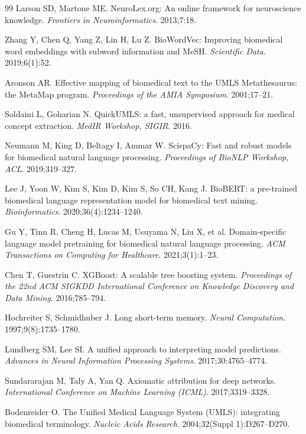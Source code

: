 \documentclass[11pt,a4paper]{article}
\begin{document}
\begin{thebibliography}{99}
Larson SD, Martone ME. NeuroLex.org: An online framework for neuroscience knowledge. \textit{Frontiers in Neuroinformatics}. 2013;7:18.

Zhang Y, Chen Q, Yang Z, Lin H, Lu Z. BioWordVec: Improving biomedical word embeddings with subword information and MeSH. \textit{Scientific Data}. 2019;6(1):52.

Aronson AR. Effective mapping of biomedical text to the UMLS Metathesaurus: the MetaMap program. \textit{Proceedings of the AMIA Symposium}. 2001;17--21.

Soldaini L, Goharian N. QuickUMLS: a fast, unsupervised approach for medical concept extraction. \textit{MedIR Workshop, SIGIR}. 2016.

Neumann M, King D, Beltagy I, Ammar W. ScispaCy: Fast and robust models for biomedical natural language processing. \textit{Proceedings of BioNLP Workshop, ACL}. 2019;319--327.

Lee J, Yoon W, Kim S, Kim D, Kim S, So CH, Kang J. BioBERT: a pre-trained biomedical language representation model for biomedical text mining. \textit{Bioinformatics}. 2020;36(4):1234--1240.

Gu Y, Tinn R, Cheng H, Lucas M, Usuyama N, Liu X, et al. Domain-specific language model pretraining for biomedical natural language processing. \textit{ACM Transactions on Computing for Healthcare}. 2021;3(1):1--23.

Chen T, Guestrin C. XGBoost: A scalable tree boosting system. \textit{Proceedings of the 22nd ACM SIGKDD International Conference on Knowledge Discovery and Data Mining}. 2016;785--794.

Hochreiter S, Schmidhuber J. Long short-term memory. \textit{Neural Computation}. 1997;9(8):1735--1780.

Lundberg SM, Lee SI. A unified approach to interpreting model predictions. \textit{Advances in Neural Information Processing Systems}. 2017;30:4765--4774.

Sundararajan M, Taly A, Yan Q. Axiomatic attribution for deep networks. \textit{International Conference on Machine Learning (ICML)}. 2017;3319--3328.

Bodenreider O. The Unified Medical Language System (UMLS): integrating biomedical terminology. \textit{Nucleic Acids Research}. 2004;32(Suppl 1):D267--D270.


\end{thebibliography}
\end{document}
